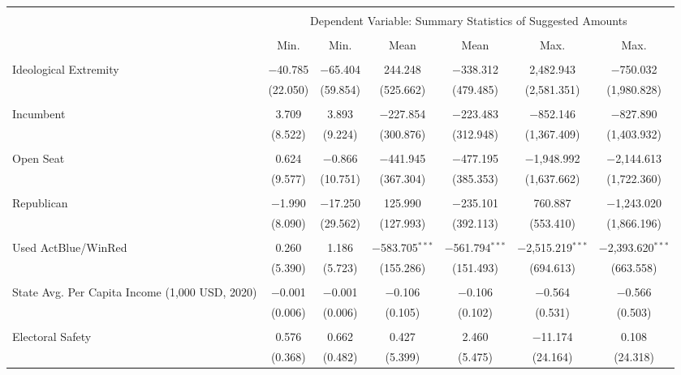 
\begin{tabular}{@{\extracolsep{5pt}}lcccccc} 
\\[-1.8ex]\hline 
\hline \\[-1.8ex] 
 & \multicolumn{6}{c}{Dependent Variable: Summary Statistics of Suggested Amounts} \\ 
\cline{2-7} 
\\[-1.8ex] & Min. & Min. & Mean & Mean & Max. & Max. \\ 
\hline \\[-1.8ex] 
 Ideological Extremity & $-$40.785 & $-$65.404 & 244.248 & $-$338.312 & 2,482.943 & $-$750.032 \\ 
  & (22.050) & (59.854) & (525.662) & (479.485) & (2,581.351) & (1,980.828) \\ 
  & & & & & & \\ 
 Incumbent & 3.709 & 3.893 & $-$227.854 & $-$223.483 & $-$852.146 & $-$827.890 \\ 
  & (8.522) & (9.224) & (300.876) & (312.948) & (1,367.409) & (1,403.932) \\ 
  & & & & & & \\ 
 Open Seat & 0.624 & $-$0.866 & $-$441.945 & $-$477.195 & $-$1,948.992 & $-$2,144.613 \\ 
  & (9.577) & (10.751) & (367.304) & (385.353) & (1,637.662) & (1,722.360) \\ 
  & & & & & & \\ 
 Republican & $-$1.990 & $-$17.250 & 125.990 & $-$235.101 & 760.887 & $-$1,243.020 \\ 
  & (8.090) & (29.562) & (127.993) & (392.113) & (553.410) & (1,866.196) \\ 
  & & & & & & \\ 
 Used ActBlue/WinRed & 0.260 & 1.186 & $-$583.705$^{***}$ & $-$561.794$^{***}$ & $-$2,515.219$^{***}$ & $-$2,393.620$^{***}$ \\ 
  & (5.390) & (5.723) & (155.286) & (151.493) & (694.613) & (663.558) \\ 
  & & & & & & \\ 
 State Avg. Per Capita Income (1,000 USD, 2020) & $-$0.001 & $-$0.001 & $-$0.106 & $-$0.106 & $-$0.564 & $-$0.566 \\ 
  & (0.006) & (0.006) & (0.105) & (0.102) & (0.531) & (0.503) \\ 
  & & & & & & \\ 
 Electoral Safety & 0.576 & 0.662 & 0.427 & 2.460 & $-$11.174 & 0.108 \\ 
  & (0.368) & (0.482) & (5.399) & (5.475) & (24.164) & (24.318) \\ 

\end{tabular}
